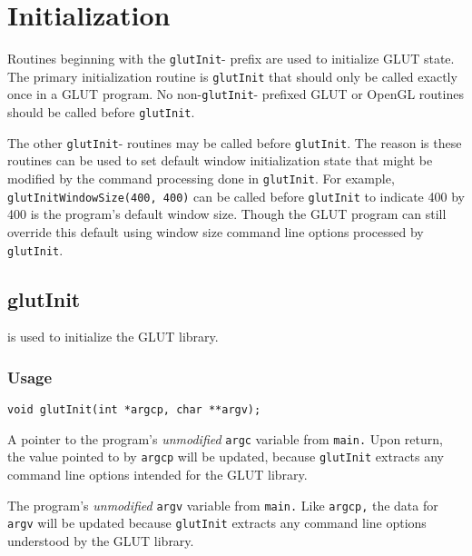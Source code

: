 
\sloppy

\section{Initialization}

Routines beginning with the {\tt glutInit}- prefix are used to initialize
GLUT state.  The primary initialization routine is {\tt glutInit} that
should only be called exactly once in a GLUT program.  No non-{\tt glutInit}- prefixed
GLUT or OpenGL routines should be called before {\tt glutInit}.

The other {\tt glutInit}- routines may be called before {\tt glutInit}.
The reason is these routines can be used to set default window initialization
state that might be modified by the command processing done in {\tt glutInit}.
For example, {\tt glutInitWindowSize(400, 400)}
can be called before {\tt glutInit}
to indicate 400 by 400 is the program's default window size.  Though the GLUT
program can
still override this default using window size command line options processed by
{\tt glutInit}.

\subsection{glutInit}

 is used to initialize the GLUT library.

\subsubsection*{Usage}

\begin{verbatim}
void glutInit(int *argcp, char **argv);
\end{verbatim}

\begin{description}
\itemsep 0in
\item[\tt argcp] A pointer to the program's
{\em unmodified} {\tt argc} variable from {\tt main.}
Upon return, the value pointed to by {\tt argcp}
will be updated, because {\tt glutInit}
extracts any command line options intended for the GLUT library.

\item[\tt argv] The program's {\em unmodified} {\tt argv} variable from
{\tt main.} Like {\tt argcp,} the data for {\tt argv}
will be updated because {\tt glutInit}
extracts any command line options understood by the GLUT library.
\end{description}

